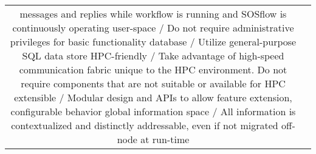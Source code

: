 \begin{table}[!t]
\begin{tabular}{|c|c|}
                             messages and replies while
                             workflow is running and SOSflow is
                             continuously operating
%
\hline %
%
user-space                 / Do not require administrative
                             privileges for basic functionality
%
\hline %
%
database                   / Utilize general-purpose SQL data store
%
\hline %
%
HPC-friendly               / Take advantage of high-speed
                             communication fabric unique to the
                             HPC environment.  Do not require
                             components that are not suitable or
                             available for HPC
%
\hline %
%
extensible                 / Modular design and APIs to allow
                             feature extension, configurable behavior
%
\hline %
%
global information space   / All information is contextualized and
                             distinctly addressable, even if not
                             migrated off-node at run-time
%
\hline %
\end{tabular}
\end{table}


